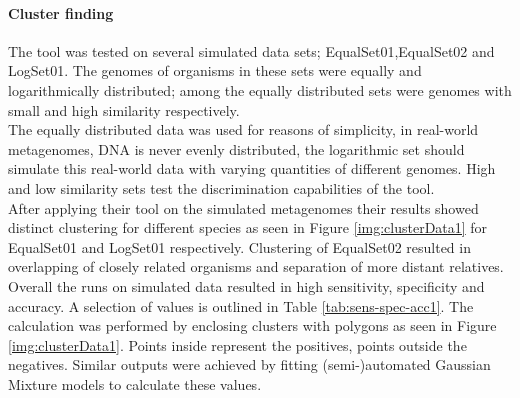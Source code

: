 \documentclass[twocolumn]{bmcart}%
\begin{document}
\paragraph*{Cluster finding}
The tool was tested on several simulated data sets; EqualSet01,EqualSet02 and LogSet01. The genomes of organisms in these sets were equally and logarithmically distributed; among the equally distributed sets were genomes with small and high similarity respectively. \\
The equally distributed data was used for reasons of simplicity, in real-world metagenomes, DNA is never evenly distributed, the logarithmic set should simulate this real-world data with varying quantities of different genomes. High and low similarity sets test the discrimination capabilities of the tool.\\
After applying their tool on the simulated metagenomes their results showed distinct clustering for different species as seen in Figure \ref{img:clusterData1} for EqualSet01 and LogSet01 respectively. Clustering of EqualSet02 resulted in overlapping of closely related organisms and separation of more distant relatives. \\
Overall the runs on simulated data resulted in high sensitivity, specificity and accuracy. A selection of values is outlined in Table \ref{tab:sens-spec-acc1}. The calculation was performed by enclosing clusters with polygons as seen in Figure \ref{img:clusterData1}. Points inside represent the positives, points outside the negatives. Similar outputs were achieved by fitting (semi-)automated Gaussian Mixture models to calculate these values.
\end{document}
